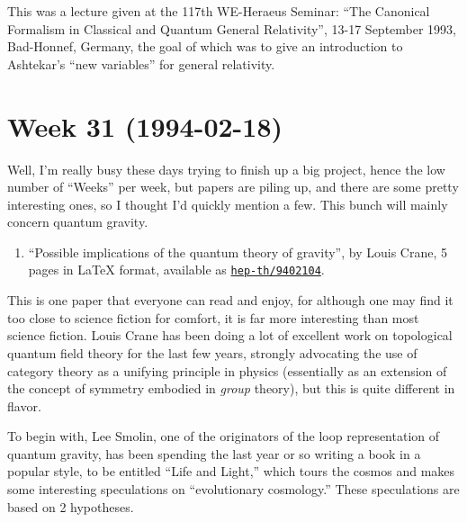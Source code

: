 \documentclass{article}
\def\tightlist{}
\begin{document}
This was a lecture given at the 117th WE-Heraeus Seminar: ``The
Canonical Formalism in Classical and Quantum General Relativity'', 13-17
September 1993, Bad-Honnef, Germany, the goal of which was to give an
introduction to Ashtekar's ``new variables'' for general relativity.
\hypertarget{week-31-1994-02-18}{%
\section{Week 31 (1994-02-18)}\label{week-31-1994-02-18}}

Well, I'm really busy these days trying to finish up a big project,
hence the low number of ``Weeks'' per week, but papers are piling up,
and there are some pretty interesting ones, so I thought I'd quickly
mention a few. This bunch will mainly concern quantum gravity.

\begin{enumerate}
\def\labelenumi{\arabic{enumi})}
\tightlist
\item
  ``Possible implications of the quantum theory of gravity'', by Louis
  Crane, 5 pages in LaTeX format, available as
  \href{http://xxx.lanl.gov/abs/hep-th/9402104}{\texttt{hep-th/9402104}}.
\end{enumerate}

This is one paper that everyone can read and enjoy, for although one may
find it too close to science fiction for comfort, it is far more
interesting than most science fiction. Louis Crane has been doing a lot
of excellent work on topological quantum field theory for the last few
years, strongly advocating the use of category theory as a unifying
principle in physics (essentially as an extension of the concept of
symmetry embodied in \emph{group} theory), but this is quite different
in flavor.

To begin with, Lee Smolin, one of the originators of the loop
representation of quantum gravity, has been spending the last year or so
writing a book in a popular style, to be entitled ``Life and Light,''
which tours the cosmos and makes some interesting speculations on
``evolutionary cosmology.'' These speculations are based on 2
hypotheses.
\end{document}
